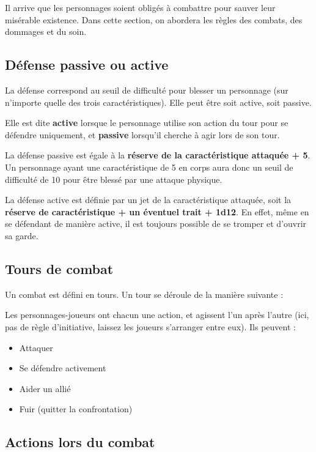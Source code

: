 \documentclass[10pt,twoside,twocolumn,openany,bg=print,justified]{dndbook}
\begin{document}
Il arrive que les personnages soient obligés à combattre pour sauver leur misérable existence. Dans cette section, on abordera les règles des combats, des dommages et du soin.

\subsection{Défense passive ou active}

La défense correspond au seuil de difficulté pour blesser un personnage (sur n'importe quelle des trois caractéristiques). Elle peut être soit active, soit passive.

Elle est dite \textbf{active} lorsque le personnage utilise son action du tour pour se défendre uniquement, et \textbf{passive} lorsqu'il cherche à agir lors de son tour.

La défense passive est égale à la \textbf{réserve de la caractéristique attaquée + 5}. Un personnage ayant une caractéristique de 5 en corps aura donc un seuil de difficulté de 10 pour être blessé par une attaque physique.

La défense active est définie par un jet de la caractéristique attaquée, soit la \textbf{réserve de caractéristique + un éventuel trait + 1d12}. En effet, même en se défendant de manière active, il est toujours possible de se tromper et d'ouvrir sa garde.

\subsection{Tours de combat}

Un combat est défini en tours. Un tour se déroule de la manière suivante :

Les personnages-joueurs ont chacun une action, et agissent l'un après l'autre (ici, pas de règle d'initiative, laissez les joueurs s'arranger entre eux). Ils peuvent :

\begin{itemize}
\item Attaquer
\item Se défendre activement
\item Aider un allié
\item Fuir (quitter la confrontation)
\end{itemize}

\subsection{Actions lors du combat}
\end{document}
